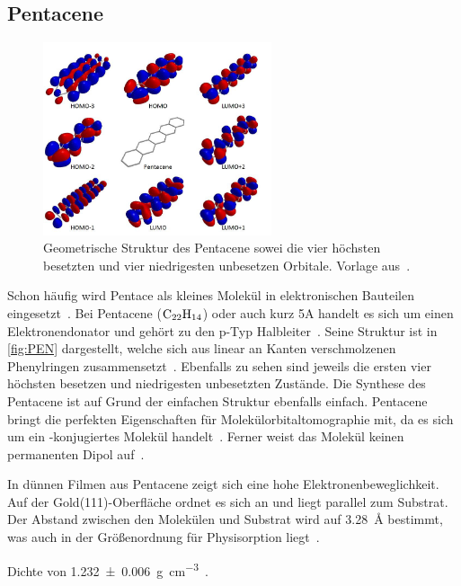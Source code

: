         \subsection{Pentacene} \label{sec:5A}         
            \begin{figure}
                \centering
                \includegraphics[width=0.6\textwidth]{PEN.jpg}
                \caption{Geometrische Struktur des Pentacene sowei die vier höchsten besetzten und vier niedrigesten unbesetzen Orbitale. Vorlage aus~\cite{PEN}.}
                \label{fig:PEN}
            \end{figure}
            Schon häufig wird Pentace als kleines Molekül in elektronischen Bauteilen eingesetzt~\cite{5A_4}.
            Bei Pentacene ($\ce{C22H14}$) oder auch kurz 5A handelt es sich um einen Elektronendonator und gehört zu den p-Typ Halbleiter~\cite{5A_1}.
            Seine Struktur ist in \autoref{fig:PEN} dargestellt, welche sich aus linear an Kanten verschmolzenen Phenylringen zusammensetzt~\cite{MM_2}.
            Ebenfalls zu sehen sind jeweils die ersten vier höchsten besetzen und niedrigesten unbesetzten Zustände.
            Die Synthese des Pentacene ist auf Grund der einfachen Struktur ebenfalls einfach.
            Pentacene bringt die perfekten Eigenschaften für Molekülorbitaltomographie mit, da es sich um ein \pi-konjugiertes Molekül handelt~\cite{MM_2}.
            Ferner weist das Molekül keinen permanenten Dipol auf~\cite{5A_4}.

            In dünnen Filmen aus Pentacene zeigt sich eine hohe Elektronenbeweglichkeit.
            Auf der Gold(111)-Oberfläche ordnet es sich an und liegt parallel zum Substrat.
            Der Abstand zwischen den Molekülen und Substrat wird auf \SI{3.28}{\angstrom} bestimmt, was auch in der Größenordnung für Physisorption liegt~\cite{5A_1}.
            

            Dichte von \SI{1.232(6)}{\gram\per\cubic\centi\meter}~\cite{CAS}.

